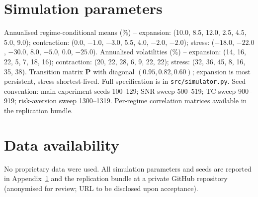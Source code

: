 \documentclass[review,12pt,authoryear]{elsarticle}
\begin{document}
\section{Simulation parameters}
\label{app:sim}

Annualised regime-conditional means (\%) -- expansion: (10.0, 8.5, 12.0, 2.5, 4.5, 5.0, 9.0);
contraction: (0.0, $-1.0$, $-3.0$, 5.5, 4.0, $-2.0$, $-2.0$); stress: ($-18.0$, $-22.0$,
$-30.0$, 8.0, $-5.0$, 0.0, $-25.0$). Annualised volatilities (\%) -- expansion: (14, 16,
22, 5, 7, 18, 16); contraction: (20, 22, 28, 6, 9, 22, 22); stress: (32, 36, 45, 8, 16,
35, 38). Transition matrix $\mathbf{P}$ with diagonal $(0.95, 0.82, 0.60)$; expansion is
most persistent, stress shortest-lived. Full specification is in
\texttt{src/simulator.py}. Seed convention: main experiment seeds 100--129; SNR sweep
500--519; TC sweep 900--919; risk-aversion sweep 1300--1319. Per-regime correlation
matrices available in the replication bundle.

\section*{Data availability}
No proprietary data were used. All simulation parameters and seeds are reported in
Appendix~\ref{app:sim} and the replication bundle at
a private GitHub repository (anonymised for review; URL to be disclosed upon acceptance).



\end{document}
